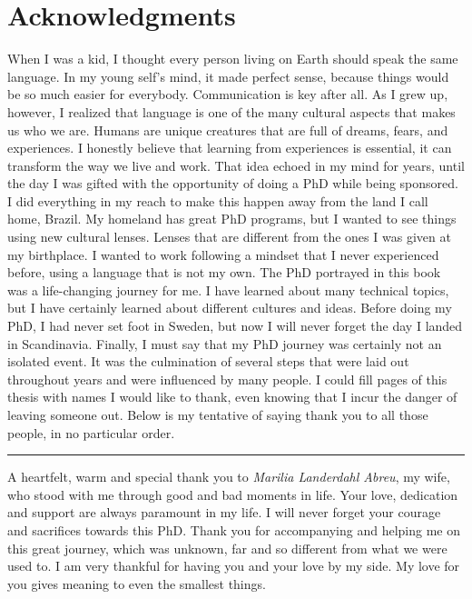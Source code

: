 \chapter*{Acknowledgments}

When I was a kid, I thought every person living on Earth should speak the same language. In my young self's mind, it made perfect sense, because things would be so much easier for everybody. Communication is key after all. As I grew up, however, I realized that language is one of the many cultural aspects that makes us who we are. Humans are unique creatures that are full of dreams, fears, and experiences. I honestly believe that learning from experiences is essential, it can transform the way we live and work. That idea echoed in my mind for years, until the day I was gifted with the opportunity of doing a PhD while being sponsored. I did everything in my reach to make this happen away from the land I call home, Brazil. My homeland has great PhD programs, but I wanted to see things using new cultural lenses. Lenses that are different from the ones I was given at my birthplace. I wanted to work following a mindset that I never experienced before, using a language that is not my own. The PhD portrayed in this book was a life-changing journey for me. I have learned about many technical topics, but I have certainly learned about different cultures and ideas. Before doing my PhD, I had never set foot in Sweden, but now I will never forget the day I landed in Scandinavia. Finally, I must say that my PhD journey was certainly not an isolated event. It was the culmination of several steps that were laid out throughout years and were influenced by many people. I could fill pages of this thesis with names I would like to thank, even knowing that I incur the danger of leaving someone out. Below is my tentative of saying thank you to all those people, in no particular order.

\vspace{7pt}\hrule\vspace{5pt}

A heartfelt, warm and special thank you to \textit{Marilia Landerdahl Abreu}, my wife, who stood with me through good and bad moments in life. Your love, dedication and support are always paramount in my life. I will never forget your courage and sacrifices towards this PhD. Thank you for accompanying and helping me on this great journey, which was unknown, far and so different from what we were used to. I am very thankful for having you and your love by my side. My love for you gives meaning to even the smallest things.

